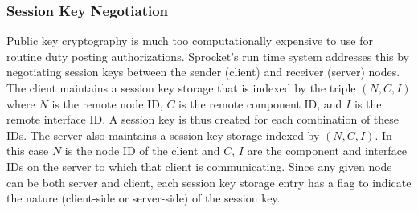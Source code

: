 \subsubsection{Session Key Negotiation}

Public key cryptography is much too computationally expensive to use for
routine duty posting authorizations. Sprocket's run time system addresses this by
negotiating session keys between the sender (client) and receiver
(server) nodes. 
%
%  
%
The client maintains a session key storage that is indexed by the triple
$(N, C, I)$ where $N$ is the remote node ID, $C$ is the remote component
ID, and $I$ is the remote interface ID. A session key is thus created
for each combination of these IDs. The server also maintains a session
key storage indexed by $(N, C, I)$. In this case $N$ is the node ID of
the client and $C$, $I$ are the component and interface IDs on the
server to which that client is communicating. Since any given node can
be both server and client, each session key storage entry has a flag to
indicate the nature (client-side or server-side) of the session key.

%

